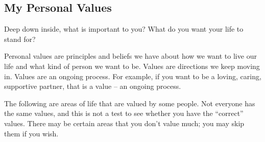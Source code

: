 	\subsection{My Personal Values}
		Deep down inside, what is important to you? What do you want your life to stand for?  

		Personal values are principles and beliefs we have about how we want to live our life and what kind of person we want to be. Values are directions we keep moving in. Values are an ongoing process. For example, if you want to be a loving, caring, supportive partner, that is a value – an ongoing process.  


		The following are areas of life that are valued by some people. Not everyone has the same values, and this is not a test to see whether you have the “correct” values. There may be certain areas that you don’t value much; you may skip them if you wish. 

